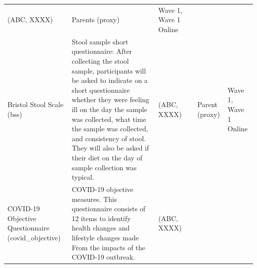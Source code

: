 \documentclass[]{book}
\begin{document}
\begin{longtable}[]{@{}llllll@{}}
\begin{minipage}[t]{0.15\columnwidth}
(ABC, XXXX)\strut
\end{minipage} & \begin{minipage}[t]{0.16\columnwidth}\raggedright
Parents (proxy)\strut
\end{minipage} & \begin{minipage}[t]{0.06\columnwidth}\raggedright
Wave 1, Wave 1 Online\strut
\end{minipage} & \begin{minipage}[t]{0.10\columnwidth}\raggedright
\strut
\end{minipage}\tabularnewline
\begin{minipage}[t]{0.18\columnwidth}\raggedright
Bristol Stool Scale (bss)\strut
\end{minipage} & \begin{minipage}[t]{0.18\columnwidth}\raggedright
Stool sample short questionnaire: After collecting the stool sample, participants will be asked to indicate on a short questionnaire whether they were feeling ill on the day the sample was collected, what time the sample was collected, and consistency of stool. They will also be asked if their diet on the day of sample collection was typical.\strut
\end{minipage} & \begin{minipage}[t]{0.15\columnwidth}\raggedright
(ABC, XXXX)\strut
\end{minipage} & \begin{minipage}[t]{0.16\columnwidth}\raggedright
\strut
\end{minipage} & \begin{minipage}[t]{0.06\columnwidth}\raggedright
Parent (proxy)\strut
\end{minipage} & \begin{minipage}[t]{0.10\columnwidth}\raggedright
Wave 1, Wave 1 Online\strut
\end{minipage}\tabularnewline
\begin{minipage}[t]{0.18\columnwidth}\raggedright
COVID-19 Objective Questionnaire (covid\_objective)\strut
\end{minipage} & \begin{minipage}[t]{0.18\columnwidth}\raggedright
COVID-19 objective measures. This questionnaire consists of 12 items to identify health changes and lifestyle changes made From the impacts of the COVID-19 outbreak.\strut
\end{minipage} & \begin{minipage}[t]{0.15\columnwidth}\raggedright
(ABC, XXXX)\strut
\end{minipage} & \begin{minipage}[t]{0.16\columnwidth}\raggedright

\end{minipage}
\end{longtable}
\end{document}
